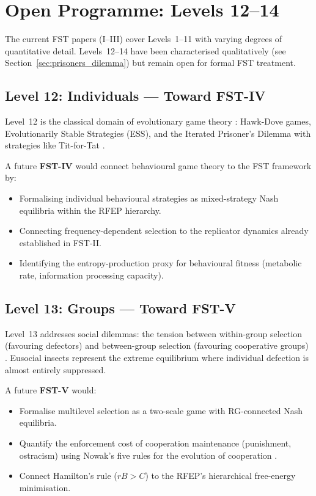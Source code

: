 \documentclass[12pt,a4paper]{article}
\theoremstyle{remark}
\begin{document}
\section{Open Programme: Levels 12--14}
\label{sec:open_programme}

The current FST papers (I--III) cover Levels~1--11 with varying degrees of quantitative detail. Levels~12--14 have been characterised qualitatively (see Section~\ref{sec:prisoners_dilemma}) but remain open for formal FST treatment.

\subsection{Level 12: Individuals --- Toward FST-IV}

Level~12 is the classical domain of evolutionary game theory \citep{MaynardSmith1982}: Hawk-Dove games, Evolutionarily Stable Strategies (ESS), and the Iterated Prisoner's Dilemma with strategies like Tit-for-Tat \citep{Axelrod1984}.

A future \textbf{FST-IV} would connect behavioural game theory to the FST framework by:
\begin{itemize}[leftmargin=2em]
  \item Formalising individual behavioural strategies as mixed-strategy Nash equilibria within the RFEP hierarchy.
  \item Connecting frequency-dependent selection to the replicator dynamics already established in FST-II.
  \item Identifying the entropy-production proxy for behavioural fitness (metabolic rate, information processing capacity).
\end{itemize}

\subsection{Level 13: Groups --- Toward FST-V}

Level~13 addresses social dilemmas: the tension between within-group selection (favouring defectors) and between-group selection (favouring cooperative groups) \citep{Wilson2007}. Eusocial insects represent the extreme equilibrium where individual defection is almost entirely suppressed.

A future \textbf{FST-V} would:
\begin{itemize}[leftmargin=2em]
  \item Formalise multilevel selection as a two-scale game with RG-connected Nash equilibria.
  \item Quantify the enforcement cost of cooperation maintenance (punishment, ostracism) using Nowak's five rules for the evolution of cooperation \citep{Nowak2006}.
  \item Connect Hamilton's rule ($rB > C$) \citep{Hamilton1964} to the RFEP's hierarchical free-energy minimisation.
\end{itemize}
\end{document}
